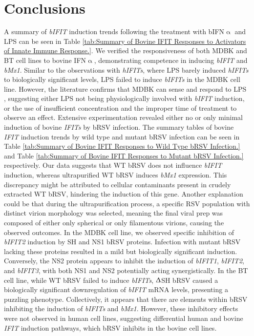 \section{Conclusions} \label{sec:Conclusions Chapter2}
A summary of \textit{bIFIT} induction trends following the treatment with bIFN$\upalpha$ and LPS can be seen in Table \ref{tab:Summary of Bovine IFIT Responses to Activators of Innate Immune Response.}. We verified the responsiveness of both MDBK and BT cell lines to bovine IFN$\upalpha$, demonstrating competence in inducing \textit{bIFIT} and \textit{bMx1}. Similar to the observations with \textit{hIFITs}, where LPS barely induced \textit{hIFITs} to biologically significant levels, LPS failed to induce \textit{bIFITs} in the MDBK cell line. However, the literature confirms that MDBK can sense and respond to LPS \cite{Cui2022ThePathway}, suggesting either LPS not being physiologically involved with \textit{bIFIT} induction, or the use of insufficient concentration and the improper time of treatment to observe an effect. Extensive experimentation revealed either no or only minimal induction of bovine \textit{IFITs} by bRSV infection. The summary tables of bovine \textit{IFIT} induction trends by wild type and mutant bRSV infection can be seen in Table \ref{tab:Summary of Bovine IFIT Responses to Wild Type bRSV Infection.} and Table \ref{tab:Summary of Bovine IFIT Responses to Mutant bRSV Infection.} respectively. Our data suggests that WT bRSV does not influence \textit{bIFIT} induction, whereas ultrapurified WT bRSV induces \textit{bMx1} expression. This discrepancy might be attributed to cellular contaminants present in crudely extracted WT bRSV, hindering the induction of this gene. Another explanation could be that during the ultrapurification process, a specific RSV population with distinct virion morphology was selected, meaning the final viral prep was composed of either only spherical or only filamentous virions, causing the observed outcomes. In the MDBK cell line, we observed specific inhibition of \textit{bIFIT2} induction by SH and NS1 bRSV proteins. Infection with mutant bRSV lacking these proteins resulted in a mild but biologically significant induction. Conversely, the NS2 protein appears to inhibit the induction of \textit{bIFIT1}, \textit{bIFIT2}, and \textit{bIFIT3}, with both NS1 and NS2 potentially acting synergistically. In the BT cell line, while WT bRSV failed to induce \textit{bIFITs}, $\Updelta$SH bRSV caused a biologically significant downregulation of \textit{bIFIT} mRNA levels, presenting a puzzling phenotype. Collectively, it appears that there are elements within bRSV inhibiting the induction of \textit{bIFITs} and \textit{bMx1}. However, these inhibitory effects were not observed in human cell lines, suggesting differential human and bovine \textit{IFIT} induction pathways, which bRSV inhibits in the bovine cell lines.

